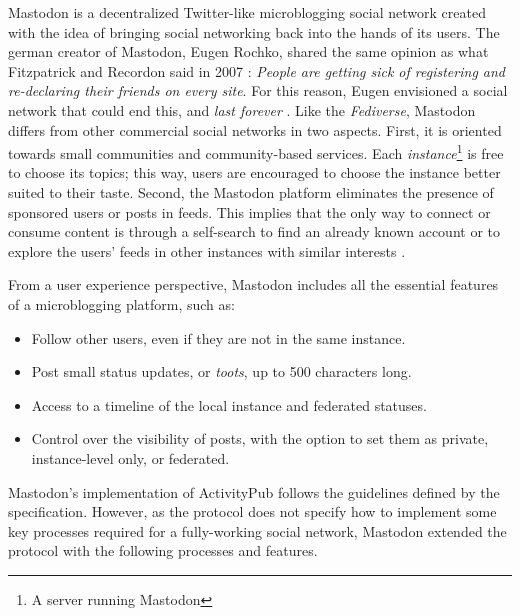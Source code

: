  Mastodon is a decentralized Twitter-like microblogging social network created with the idea of bringing social networking back into the hands of its users. The german creator of Mastodon, Eugen Rochko, shared the same opinion as what Fitzpatrick and Recordon said in 2007 \cite{fitzpatrick_recordon_2007}: \emph{People are getting sick of registering and re-declaring their friends on every site}. For this reason, Eugen envisioned a social network that could end this, and \emph{last forever} \cite{tilley_2018}. Like the \emph{Fediverse}, Mastodon differs from other commercial social networks in two aspects. First, it is oriented towards small communities and community-based services. Each \emph{instance}\footnote{A server running Mastodon} is free to choose its topics; this way, users are encouraged to choose the instance better suited to their taste. Second, the Mastodon platform eliminates the presence of sponsored users or posts in feeds. This implies that the only way to connect or consume content is through a self-search to find an already known account or to explore the users' feeds in other instances with similar interests \cite{8845221}. 
 
 From a user experience perspective, Mastodon includes all the essential features of a microblogging platform, such as:

\begin{itemize}
  \item Follow other users, even if they are not in the same instance. 
  \item Post small status updates, or \emph{toots}, up to 500 characters long. 
  \item Access to a timeline of the local instance and federated statuses. 
  \item Control over the visibility of posts, with the option to set them as private, instance-level only, or federated. 
\end{itemize}

Mastodon's implementation of ActivityPub follows the guidelines defined by the specification. However, as the protocol does not specify how to implement some key processes required for a fully-working social network, Mastodon extended the protocol with the following processes and features.

